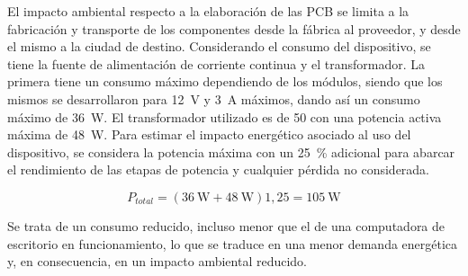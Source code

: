 El impacto ambiental respecto a la elaboración de las PCB se limita a la fabricación y transporte de los componentes desde la fábrica al proveedor, y desde el mismo a la ciudad de destino. Considerando el consumo del dispositivo, se tiene la fuente de alimentación de corriente continua y el transformador. La primera tiene un consumo máximo dependiendo de los módulos, siendo que los mismos se desarrollaron para \SI{12}{\volt} y \SI{3}{\ampere} máximos, dando así un consumo máximo de \SI{36}{\watt}. El transformador utilizado es de \SI{50}{\voltampere} con una potencia activa máxima de \SI{48}{\watt}. Para estimar el impacto energético asociado al uso del dispositivo, se considera la potencia máxima con un \SI{25}{\percent} adicional para abarcar el rendimiento de las etapas de potencia y cualquier pérdida no considerada.

\begin{equation} \label{eq:IA:potencia-total}
    P_{total} = (\SI{36}{\watt} + \SI{48}{\watt}) 1,25 = \SI{105}{\watt}
\end{equation}

Se trata de un consumo reducido, incluso menor que el de una computadora de escritorio en funcionamiento, lo que se traduce en una menor demanda energética y, en consecuencia, en un impacto ambiental reducido.